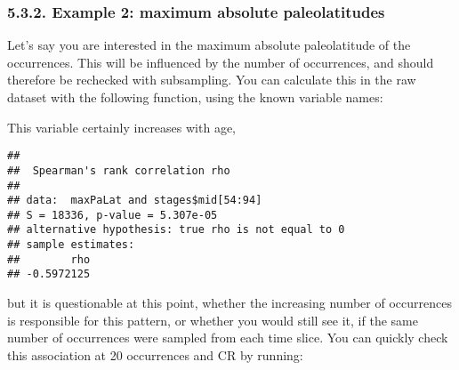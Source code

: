 \documentclass[]{article}
\newenvironment{Shaded}{\begin{snugshade}}{\end{snugshade}}
\newcommand{\ControlFlowTok}[1]{\textcolor[rgb]{0.13,0.29,0.53}{\textbf{#1}}}
\newcommand{\DataTypeTok}[1]{\textcolor[rgb]{0.13,0.29,0.53}{#1}}
\newcommand{\DecValTok}[1]{\textcolor[rgb]{0.00,0.00,0.81}{#1}}
\newcommand{\KeywordTok}[1]{\textcolor[rgb]{0.13,0.29,0.53}{\textbf{#1}}}
\newcommand{\NormalTok}[1]{#1}
\newcommand{\OperatorTok}[1]{\textcolor[rgb]{0.81,0.36,0.00}{\textbf{#1}}}
\newcommand{\StringTok}[1]{\textcolor[rgb]{0.31,0.60,0.02}{#1}}
\begin{document}
\hypertarget{example-2-maximum-absolute-paleolatitudes}{%
\subsubsection{5.3.2. Example 2: maximum absolute
paleolatitudes}\label{example-2-maximum-absolute-paleolatitudes}}

Let's say you are interested in the maximum absolute paleolatitude of
the occurrences. This will be influenced by the number of occurrences,
and should therefore be rechecked with subsampling. You can calculate
this in the raw dataset with the following function, using the known
variable names:

\begin{Shaded}
\end{Shaded}

This variable certainly increases with age,

\begin{Shaded}
\end{Shaded}

\begin{verbatim}
## 
##  Spearman's rank correlation rho
## 
## data:  maxPaLat and stages$mid[54:94]
## S = 18336, p-value = 5.307e-05
## alternative hypothesis: true rho is not equal to 0
## sample estimates:
##        rho 
## -0.5972125
\end{verbatim}

but it is questionable at this point, whether the increasing number of
occurrences is responsible for this pattern, or whether you would still
see it, if the same number of occurrences were sampled from each time
slice. You can quickly check this association at 20 occurrences and CR
by running:
\end{document}

